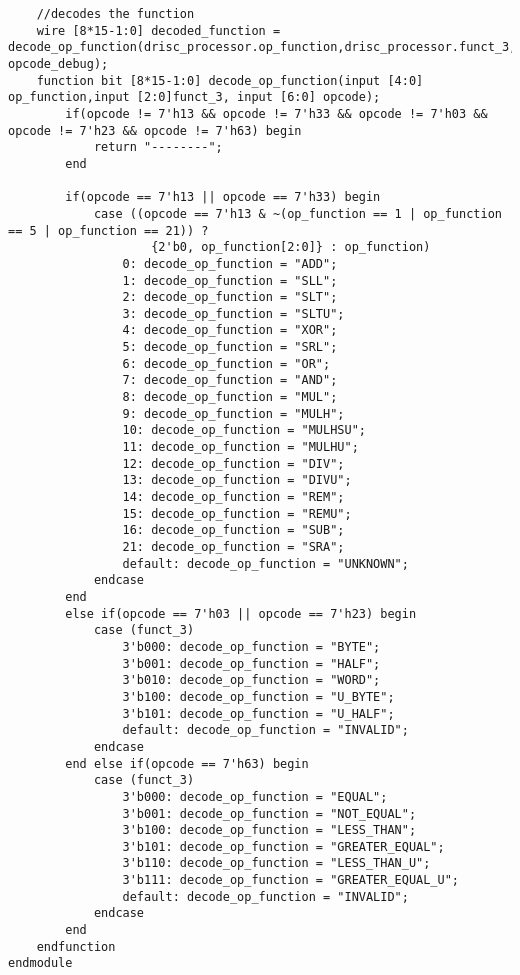 \begin{lstlisting}
    //decodes the function
    wire [8*15-1:0] decoded_function = decode_op_function(drisc_processor.op_function,drisc_processor.funct_3, opcode_debug);
    function bit [8*15-1:0] decode_op_function(input [4:0] op_function,input [2:0]funct_3, input [6:0] opcode);
        if(opcode != 7'h13 && opcode != 7'h33 && opcode != 7'h03 && opcode != 7'h23 && opcode != 7'h63) begin
            return "--------";
        end
        
        if(opcode == 7'h13 || opcode == 7'h33) begin
            case ((opcode == 7'h13 & ~(op_function == 1 | op_function == 5 | op_function == 21)) ? 
                    {2'b0, op_function[2:0]} : op_function)
                0: decode_op_function = "ADD";
                1: decode_op_function = "SLL";
                2: decode_op_function = "SLT";
                3: decode_op_function = "SLTU";
                4: decode_op_function = "XOR";
                5: decode_op_function = "SRL";
                6: decode_op_function = "OR";
                7: decode_op_function = "AND";
                8: decode_op_function = "MUL";
                9: decode_op_function = "MULH";
                10: decode_op_function = "MULHSU";
                11: decode_op_function = "MULHU";
                12: decode_op_function = "DIV";
                13: decode_op_function = "DIVU";
                14: decode_op_function = "REM";
                15: decode_op_function = "REMU";
                16: decode_op_function = "SUB";
                21: decode_op_function = "SRA";
                default: decode_op_function = "UNKNOWN";
            endcase
        end
        else if(opcode == 7'h03 || opcode == 7'h23) begin
            case (funct_3)
                3'b000: decode_op_function = "BYTE";
                3'b001: decode_op_function = "HALF";
                3'b010: decode_op_function = "WORD";
                3'b100: decode_op_function = "U_BYTE";
                3'b101: decode_op_function = "U_HALF";
                default: decode_op_function = "INVALID";
            endcase
        end else if(opcode == 7'h63) begin
            case (funct_3)
                3'b000: decode_op_function = "EQUAL";
                3'b001: decode_op_function = "NOT_EQUAL";
                3'b100: decode_op_function = "LESS_THAN";
                3'b101: decode_op_function = "GREATER_EQUAL";
                3'b110: decode_op_function = "LESS_THAN_U";
                3'b111: decode_op_function = "GREATER_EQUAL_U";
                default: decode_op_function = "INVALID";
            endcase
        end        
    endfunction
endmodule
\end{lstlisting}